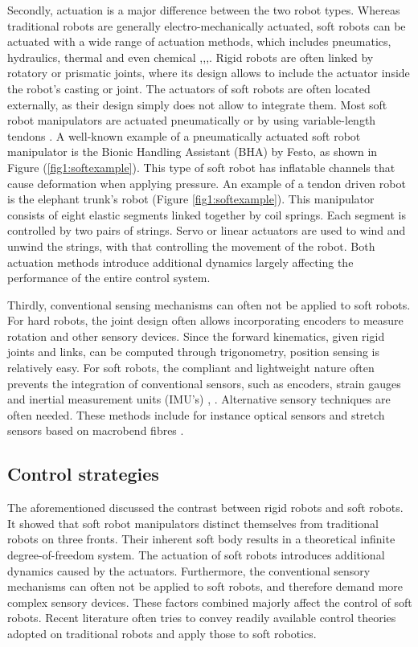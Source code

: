 Secondly, actuation is a major difference between the two robot types. Whereas traditional robots are generally electro-mechanically actuated, soft robots can be actuated with a wide range of actuation methods, which includes pneumatics, hydraulics, thermal and even chemical \cite{BHA},\cite{marchese2014},\cite{kang2019programmable},\cite{shepherd2013using}. Rigid robots are often linked by rotatory or prismatic joints, where its design allows to include the actuator inside the robot's casting or joint. The actuators of soft robots are often located externally, as their design simply does not allow to integrate them. Most soft robot manipulators are actuated pneumatically or by using variable-length tendons \cite{Rus2015}. A well-known example of a pneumatically actuated soft robot manipulator is the Bionic Handling Assistant (BHA) by Festo, as shown in Figure (\ref{fig1:softexample}). This type of soft robot has inflatable channels that cause deformation when applying pressure. An example of a tendon driven robot is the elephant trunk's robot \cite{cieslak1999elephant} (Figure \ref{fig1:softexample}). This manipulator consists of eight elastic segments linked together by coil springs. Each segment is controlled by two pairs of strings. Servo or linear actuators are used to wind and unwind the strings, with that controlling the movement of the robot. Both actuation methods introduce additional dynamics largely affecting the performance of the entire control system. 

Thirdly, conventional sensing mechanisms can often not be applied to soft robots. For hard robots, the joint design often allows incorporating encoders to measure rotation and other sensory devices. Since the forward kinematics, given rigid joints and links, can be computed through trigonometry, position sensing is relatively easy. For soft robots, the compliant and lightweight nature often prevents the integration of conventional sensors, such as encoders, strain gauges and inertial measurement units (IMU's) \cite{Rus2015}, \cite{Lee2017}. Alternative sensory techniques are often needed. These methods include for instance optical sensors and stretch sensors based on macrobend fibres \cite{Sareh2015}.

\subsection*{Control strategies}

The aforementioned discussed the contrast between rigid robots and soft robots. It showed that soft robot manipulators distinct themselves from traditional robots on three fronts. Their inherent soft body results in a theoretical infinite degree-of-freedom system. The actuation of soft robots introduces additional dynamics caused by the actuators. Furthermore, the conventional sensory mechanisms can often not be applied to soft robots, and therefore demand more complex sensory devices. These factors combined majorly affect the control of soft robots. Recent literature often tries to convey readily available control theories adopted on traditional robots and apply those to soft robotics.

